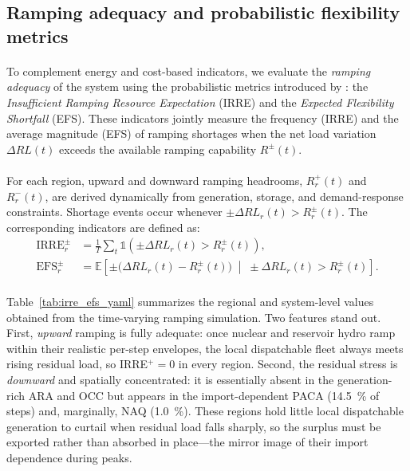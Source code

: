 \documentclass[12pt]{article}
\begin{document}
\subsection{Ramping adequacy and probabilistic flexibility metrics}
\label{subsec:irre_efs_results}

\paragraph{}
To complement energy and cost-based indicators, we evaluate the
\emph{ramping adequacy} of the system using the probabilistic metrics
introduced by \citet{abdin2018integrated,abdin2019resilient}:
the \emph{Insufficient Ramping Resource Expectation} (\textsc{IRRE})
and the \emph{Expected Flexibility Shortfall} (\textsc{EFS}).
These indicators jointly measure the frequency (\textsc{IRRE}) and the
average magnitude (\textsc{EFS}) of ramping shortages when the net load
variation $\Delta RL(t)$ exceeds the available ramping
capability $R^{\pm}(t)$.

\paragraph{}
For each region, upward and downward ramping headrooms, $R_r^{+}(t)$ and $R_r^{-}(t)$,
are derived dynamically from generation, storage, and demand-response
constraints.
Shortage events occur whenever
$\pm\Delta RL_r(t)>R^{\pm}_r(t)$.
The corresponding indicators are defined as:
\begin{align}
\text{IRRE}^{\pm}_r &=
\frac{1}{T}\sum_t
\mathds{1}\!\left(
  \pm\Delta RL_r(t)
  > R^{\pm}_r(t)
\right),
\\[4pt]
\text{EFS}^{\pm}_r &=
\mathbb{E}\!\left[
  \pm\bigl(\Delta  RL_r(t)-R^{\pm}_r(t)\bigr)
  \;\middle|\;
  \pm\Delta RL_r(t)>R^{\pm}_r(t)
\right].
\end{align}

\paragraph{}
Table~\ref{tab:irre_efs_yaml} summarizes the regional and system-level
values obtained from the time-varying ramping simulation.
Two features stand out. First, \emph{upward} ramping is fully adequate: once
nuclear and reservoir hydro ramp within their realistic per-step envelopes, the
local dispatchable fleet always meets rising residual load, so \textsc{IRRE}$^{+}=0$
in every region. Second, the residual stress is \emph{downward} and spatially
concentrated: it is essentially absent in the generation-rich ARA and OCC but
appears in the import-dependent PACA (\SI{14.5}{\percent} of steps) and, marginally,
NAQ (\SI{1.0}{\percent}). These regions hold little local dispatchable generation
to curtail when residual load falls sharply, so the surplus must be exported rather
than absorbed in place---the mirror image of their import dependence during peaks.
\end{document}
